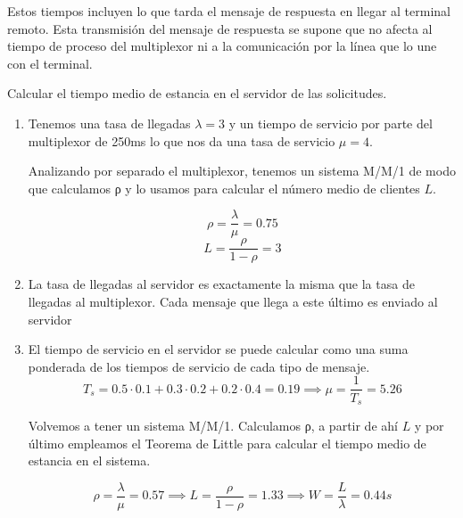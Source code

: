 \begin{problem}[8]
\begin{enumerate}
Estos tiempos incluyen lo que tarda el mensaje de respuesta en llegar al terminal remoto. Esta transmisión del mensaje de respuesta se supone que no afecta al tiempo de proceso del multiplexor ni a la comunicación por la línea que lo une con el terminal.

Calcular el tiempo medio de estancia en el servidor de las solicitudes.


\end{enumerate}

\solution

\begin{enumerate}

\item

Tenemos una tasa de llegadas $λ=3$ y un tiempo de servicio por parte del multiplexor de 250ms lo que nos da una tasa de servicio $μ=4$.

Analizando por separado el multiplexor, tenemos un sistema M/M/1 de modo que calculamos ρ y lo usamos para calcular el número medio de clientes $L$.

\[ρ=\frac{λ}{μ}=0.75\]
\[L=\frac{ρ}{1-ρ}=3\]

\item

La tasa de llegadas al servidor es exactamente la misma que la tasa de llegadas al multiplexor. Cada mensaje que llega a este último es enviado al servidor

\item

El tiempo de servicio en el servidor se puede calcular como una suma ponderada de los tiempos de servicio de cada tipo de mensaje.
\[T_s = 0.5\cdot 0.1+0.3\cdot 0.2+0.2\cdot 0.4=0.19 \implies μ = \frac{1}{T_s}=5.26\]

Volvemos a tener un sistema M/M/1. Calculamos ρ, a partir de ahí $L$ y por último empleamos el Teorema de Little para calcular el tiempo medio de estancia en el sistema.

\[ρ = \frac{λ}{μ}=0.57 \implies L=\frac{ρ}{1-ρ}=1.33 \implies W = \frac{L}{λ}=0.44 s\]
\end{enumerate}

\newpage
\end{problem}


